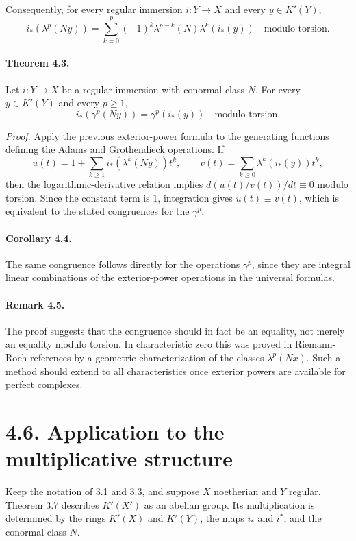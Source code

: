 \documentclass[11pt]{article}
\theoremstyle{plain}
\theoremstyle{definition}
\theoremstyle{remark}
\begin{document}
Consequently, for every regular immersion $i:Y\to X$ and every $y\in K'(Y)$,
\[
i_*(\lambda^p(Ny))=\sum_{k=0}^{p}(-1)^k\lambda^{p-k}(N)\lambda^k(i_*(y))
\quad\text{modulo torsion}.
\]

\paragraph{Theorem 4.3.} Let $i:Y\to X$ be a regular immersion with conormal class $N$. For every $y\in K'(Y)$ and every $p\geq1$,
\[
i_*(\gamma^p(Ny))=\gamma^p(i_*(y))
\quad\text{modulo torsion}.
\]

\emph{Proof.} Apply the previous exterior-power formula to the generating functions defining the Adams and Grothendieck operations. If
\[
u(t)=1+\sum_{k\geq1}i_*(\lambda^k(Ny))t^k,
\qquad
v(t)=\sum_{k\geq0}\lambda^k(i_*(y))t^k,
\]
then the logarithmic-derivative relation implies $d(u(t)/v(t))/dt\equiv0$ modulo torsion. Since the constant term is $1$, integration gives $u(t)\equiv v(t)$, which is equivalent to the stated congruences for the $\gamma^p$.

\paragraph{Corollary 4.4.} The same congruence follows directly for the operations $\gamma^p$, since they are integral linear combinations of the exterior-power operations in the universal formulas.

\paragraph{Remark 4.5.} The proof suggests that the congruence should in fact be an equality, not merely an equality modulo torsion. In characteristic zero this was proved in Riemann-Roch references by a geometric characterization of the classes $\lambda^p(Nx)$. Such a method should extend to all characteristics once exterior powers are available for perfect complexes.

\section*{4.6. Application to the multiplicative structure}

Keep the notation of 3.1 and 3.3, and suppose $X$ noetherian and $Y$ regular. Theorem 3.7 describes $K'(X')$ as an abelian group. Its multiplication is determined by the rings $K'(X)$ and $K'(Y)$, the maps $i_*$ and $i^*$, and the conormal class $N$.
\end{document}
